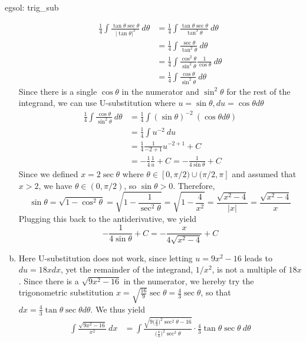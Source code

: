 \begin{egsol}[]{egsol: trig_sub}
\begin{enumerate}[a)]
\begin{align*}
                \frac{1}{4} \int \frac{\tan \theta \sec \theta}{|\tan \theta|^3}~d\theta &= \frac{1}{4} \int \frac{\tan \theta \sec \theta}{\tan^3 \theta}~d\theta\\
                &= \frac{1}{4} \int \frac{\sec \theta}{\tan^2 \theta}~d\theta\\
                &= \frac{1}{4} \int \frac{\cos^2 \theta}{\sin^2 \theta}\frac{1}{\cos \theta}~d\theta\\
                &= \frac{1}{4} \int \frac{\cos \theta}{\sin^2 \theta}~d\theta
            \end{align*}
            Since there is a single $\cos \theta$ in the numerator and $\sin^2 \theta$ for the rest of the integrand, we can use U-substitution where $u = \sin\theta, du = \cos\theta d\theta$
            \begin{align*}
                \frac{1}{4} \int \frac{\cos \theta}{\sin^2 \theta}~d\theta &= \frac{1}{4} \int (\sin \theta)^{-2}~(\cos \theta d\theta)\\
                &= \frac{1}{4} \int u^{-2}~du\\
                &= \frac{1}{4} \frac{1}{-2+1}u^{-2+1} +C \\
                &= -\frac{1}{4} \frac{1}{u} + C = -\frac{1}{4\sin\theta} + C
            \end{align*}
            Since we defined $x = 2\sec \theta$ where $\theta \in [0, \pi/2) \cup (\pi/2, \pi]$ and assumed that $x > 2$, we have $\theta \in (0, \pi/2)$, so $\sin \theta > 0$.  Therefore,
            \[\sin \theta = \sqrt{1-\cos^2\theta} = \sqrt{1-\frac{1}{\sec^2\theta}} = \sqrt{1-\frac{4}{x^2}} = \frac{\sqrt{x^2-4}}{|x|} = \frac{\sqrt{x^2-4}}{x}\]
            Plugging this back to the antiderivative, we yield
            \[-\frac{1}{4\sin\theta} + C = -\frac{x}{4\sqrt{x^2-4}} + C\]
            \item Here U-substitution does not work, since letting $u = 9x^2 - 16$ leads to $du = 18x dx$, yet the remainder of the integrand, $1/x^2$, is not a multiple of $18x$.  Since there is a $\sqrt{9x^2-16}$ in the numerator, we hereby try the trigonometric substitution $x = \sqrt{\frac{16}{9}}\sec \theta = \frac{4}{3}\sec \theta$, so that $dx = \frac{4}{3}\tan \theta \sec \theta d\theta$.  We thus yield
            \begin{align*}
                \int \frac{\sqrt{9x^2-16}}{x^2}~dx &= \int \frac{\sqrt{9\big(\frac{4}{3}\big)^2\sec^2\theta-16}}{\big(\frac{4}{3}\big)^2\sec^2\theta}\cdot \frac{4}{3}\tan \theta \sec \theta~d\theta\\

\end{align*}
\end{enumerate}
\end{egsol}
